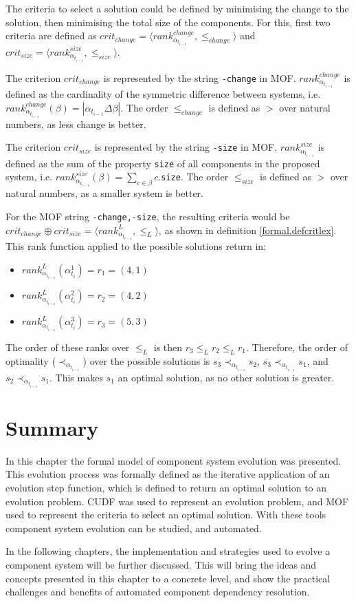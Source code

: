 The criteria to select a solution could be defined by minimising the change to the solution, then minimising the total size of the components.
For this, first two criteria are defined as $crit_{change} = \langle rank^{change}_{\alpha_{t_{i-1}}}, \leq_{change} \rangle$ and $crit_{size} = \langle rank^{size}_{\alpha_{t_{i-1}}}, \leq_{size} \rangle$.

The criterion $crit_{change}$ is represented by the string \verb+-change+ in MOF.
$rank^{change}_{\alpha_{t_{i-1}}}$ is defined as the cardinality of the symmetric difference between systems, i.e. $rank^{change}_{\alpha_{t_{i-1}}}(\beta) = |\alpha_{t_{i-1}} \Delta \beta|$.
The order $\leq_{change}$ is defined as $>$ over natural numbers, as less change is better. 

The criterion $crit_{size}$ is represented by the string \verb+-size+ in MOF.
$rank^{size}_{\alpha_{t_{i-1}}}$ is defined as the sum of the property \verb+size+ of all components in the  proposed system, i.e. $rank^{size}_{\alpha_{t_{i-1}}}(\beta) = \sum_{c \in \beta} c$.\verb+size+.
The order $\leq_{size}$ is defined as $>$ over natural numbers, as a smaller system is better. 

For the MOF string \verb+-change,-size+, the resulting criteria would be $crit_{change} \oplus crit_{size} = \langle rank^{L}_{\alpha_{t_{i-1}}}, \leq_L \rangle$, as shown in definition \ref{formal.defcritlex}.
This rank function applied to the possible solutions return in:
\begin{itemize}
  \item $rank^{L}_{\alpha_{t_{i-1}}}(\alpha_{t_i}^1 ) = r_1 = (4, 1)$
  \item $rank^{L}_{\alpha_{t_{i-1}}}(\alpha_{t_i}^2 ) = r_2 = (4, 2)$
  \item $rank^{L}_{\alpha_{t_{i-1}}}(\alpha_{t_i}^3 ) = r_3 = (5, 3)$
\end{itemize}
The order of these ranks over $\leq_L$ is then $r_3 \leq_L r_2 \leq_L r_1$.
Therefore, the order of optimality ($\prec_{\alpha_{t_{i-1}}}$) over the possible solutions is $s_3 \prec_{\alpha_{t_{i-1}}} s_2$, $s_3 \prec_{\alpha_{t_{i-1}}} s_1$, and $s_2 \prec_{\alpha_{t_{i-1}}} s_1$.
This makes $s_1$ an optimal solution, as no other solution is greater. 

\section{Summary}
In this chapter the formal model of component system evolution was presented.
This evolution process was formally defined as the iterative application of an evolution step function,
which is defined to return an optimal solution to an evolution problem.
CUDF was used to represent an evolution problem, and MOF used to represent the criteria to select an optimal solution.
With these tools component system evolution can be studied, and automated.

In the following chapters, the implementation and strategies used to evolve a component system will be further discussed.
This will bring the ideas and concepts presented in this chapter to a concrete level, and show the practical challenges and benefits of automated component dependency resolution. 